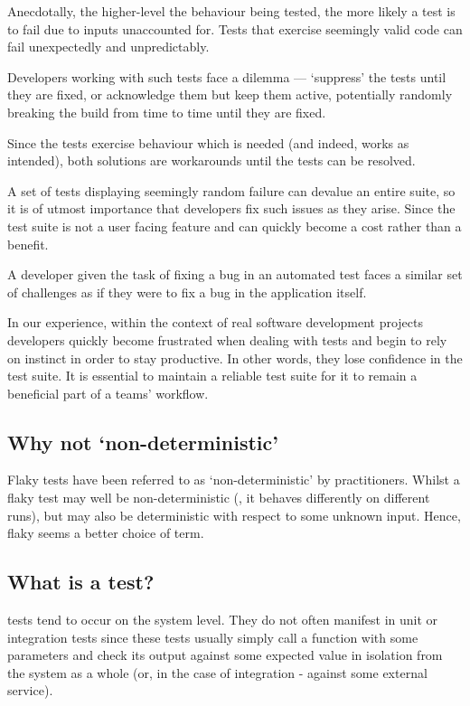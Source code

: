 Anecdotally, the higher-level the behaviour being tested, the more likely a test
is to fail due to inputs unaccounted for. Tests that exercise seemingly valid
code can fail unexpectedly and unpredictably.

Developers working with such tests face a dilemma --- {\lq}suppress{\rq} the
tests until they are fixed, or acknowledge them but keep them active,
potentially randomly breaking the build from time to time until they are fixed.

Since the tests exercise behaviour which is needed (and indeed, works as
intended), both solutions are workarounds until the tests can be resolved.

A set of tests displaying seemingly random failure can devalue an entire suite,
so it is of utmost importance that developers fix such issues as they arise.
Since the test suite is not a user facing feature and can quickly become a cost
rather than a benefit.

A developer given the task of fixing a bug in an automated test faces a similar
set of challenges as if they were to fix a bug in the application itself.

In our experience, within the context of real software development projects
developers quickly become frustrated when dealing with \flaky tests and begin to
rely on instinct in order to stay productive. In other words, they lose
confidence in the test suite. It is essential to maintain a reliable test suite
for it to remain a beneficial part of a teams' workflow.


\subsection{Why not {\lq}non-deterministic{\rq}}

Flaky tests have been referred to as {\lq}non-deterministic{\rq} by
practitioners. Whilst a flaky test may well be non-deterministic (\ie, it
behaves differently on different runs), but may also be deterministic with
respect to some unknown input. Hence, flaky seems a better choice of term.


\subsection{What is a \flaky test?}

\flaky tests tend to occur on the system level. They do not often manifest in
unit or integration tests since these tests usually simply call a function with
some parameters and check its output against some expected value in isolation
from the system as a whole (or, in the case of integration - against some
external service).

